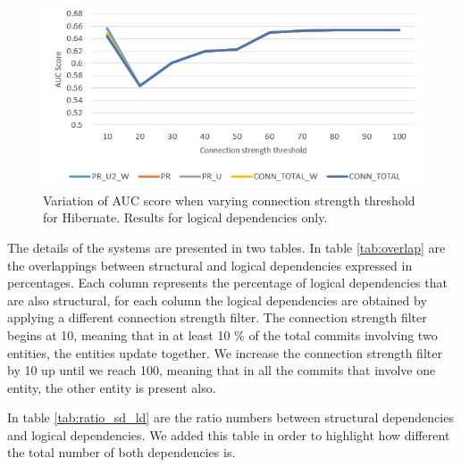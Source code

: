 \documentclass[12pt, a4paper, twoside]{report}
\begin{document}
\begin{figure}[H]
\centering
\includegraphics[width=\textwidth]{hibernate_LD.PNG}
\caption{Variation of AUC score when varying connection strength threshold for Hibernate. Results for logical dependencies only.}
\label{fig:plot_ld_hibernate}
\centering
\end{figure}


The details of the systems are presented in two tables.  In table \ref{tab:overlap} are the overlappings between structural and logical dependencies expressed in percentages. Each column represents the percentage of logical dependencies that are also structural, for each column the logical dependencies are obtained by applying a different connection strength filter. The connection strength filter begins at 10, meaning that in at least 10 \% of the total commits involving two entities, the entities update together. We increase the connection strength filter by 10 up until we reach 100, meaning that in all the commits that involve one entity, the other entity is present also.


In table \ref{tab:ratio_sd_ld} are the ratio numbers between structural dependencies and logical dependencies. We added this table in order to highlight how different the total number of both dependencies is.


\begin{table}[!h]
\renewcommand{\arraystretch}{1}
\caption{Percentage of logical dependencies that are also structural dependencies}
\label{tab:overlap}
\centering
{}
\end{table}
\end{document}

